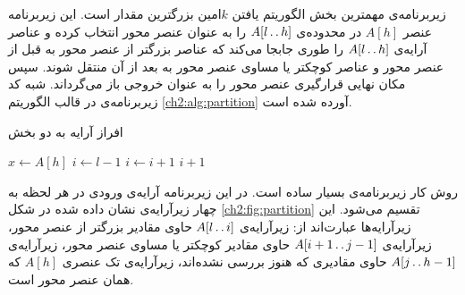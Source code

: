 زیربرنامه‌ی {} مهمترین بخش الگوریتم یافتن {$k$}امین بزرگترین مقدار است. این زیربرنامه عنصر {$A[h]$} در محدوده‌ی {$A[l\mathinner{\ldotp\ldotp} h]$} را به عنوان عنصر محور انتخاب کرده و عناصر آرایه‌ی {$A[l\mathinner{\ldotp\ldotp} h]$} را طوری جابجا می‌کند که عناصر بزرگتر از عنصر محور به قبل از عنصر محور و عناصر کوچکتر یا مساوی عنصر محور به بعد از آن منتقل شوند. سپس مکان نهایی قرارگیری عنصر محور را به عنوان خروجی باز می‌گرداند. شبه کد زیربرنامه‌ی {} در قالب الگوریتم {\eqref{ch2:alg:partition}} آورده شده است.

\begin{algorithm}
\caption{افراز آرایه به دو بخش}\label{ch2:alg:partition}
\begin{latin}
\begin{algorithmic}[1]
		\State	$x \gets A[h]$
		\State	$i \gets l-1$
						\State	$i \gets i+1$
						\State	{}
				\EndIf
		\EndFor
		\State	{}
		\State	\Return $i+1$
\EndFunction
\end{algorithmic}
\end{latin}
\end{algorithm}

روش کار زیربرنامه‌ی {} بسیار ساده است. در این زیربرنامه آرایه‌ی ورودی در هر لحظه به چهار زیرآرایه‌ی نشان داده شده در شکل {\eqref{ch2:fig:partition}} تقسیم می‌شود. این زیرآرایه‌ها عبارت‌اند از:
 زیرآرایه‌ی {$A[l\mathinner{\ldotp\ldotp} i]$} حاوی مقادیر بزرگتر از عنصر محور،
 زیرآرایه‌ی {$A[i+1\mathinner{\ldotp\ldotp} j-1]$} حاوی مقادیر کوچکتر یا مساوی عنصر محور،
 زیرآرایه‌ی {$A[j\mathinner{\ldotp\ldotp} h-1]$} حاوی مقادیری که هنوز بررسی نشده‌اند،
 زیرآرایه‌ی تک عنصری {$A[h]$} که همان عنصر محور است.

